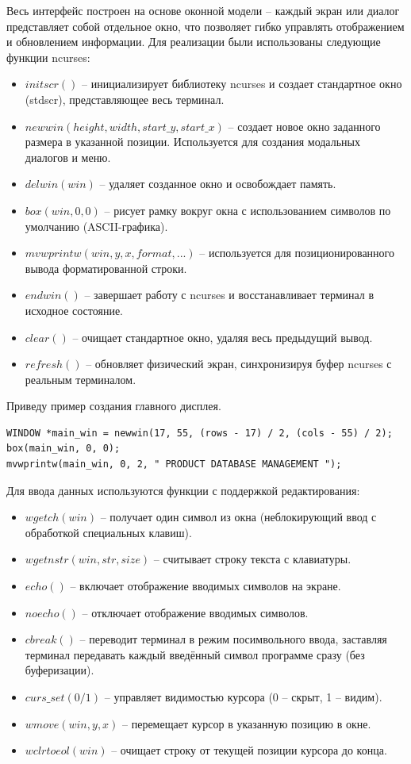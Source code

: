 \documentclass[14pt]{extreport}
\begin{document}
{Весь интерфейс построен на основе оконной модели -- каждый экран или диалог представляет собой отдельное окно, что позволяет гибко управлять отображением и обновлением информации.
Для реализации были использованы следующие функции ncurses: 
\begin{itemize}
    \item $initscr()$ -- инициализирует библиотеку ncurses и создает стандартное окно (stdscr), представляющее весь терминал. 
    \item $newwin(height, width, start\_y, start\_x)$ -- создает новое окно заданного размера в указанной позиции. Используется для создания модальных диалогов и меню.
    \item $delwin(win)$ -- удаляет созданное окно и освобождает память.
    \item $box(win, 0, 0)$ -- рисует рамку вокруг окна с использованием символов по умолчанию (ASCII-графика).
    \item $mvwprintw(win, y, x, format, ...)$ -- используется для позиционированного вывода форматированной строки. 
    \item $endwin()$ -- завершает работу с ncurses и восстанавливает терминал в исходное состояние. 
    \item $clear()$ -- очищает стандартное окно, удаляя весь предыдущий вывод.
    \item $refresh()$ -- обновляет физический экран, синхронизируя буфер ncurses с реальным терминалом.
\end{itemize}
Приведу пример создания главного дисплея.
\begin{verbatim}
WINDOW *main_win = newwin(17, 55, (rows - 17) / 2, (cols - 55) / 2);
box(main_win, 0, 0);
mvwprintw(main_win, 0, 2, " PRODUCT DATABASE MANAGEMENT ");
\end{verbatim}
Для ввода данных используются функции с поддержкой редактирования:
\begin{itemize}
    \item $wgetch(win)$ -- получает один символ из окна (неблокирующий ввод с обработкой специальных клавиш).
    \item $wgetnstr(win, str, size)$ -- считывает строку текста с клавиатуры.
    \item $echo()$ -- включает отображение вводимых символов на экране.
    \item $noecho()$ -- отключает отображение вводимых символов.
    \item $cbreak()$ -- переводит терминал в режим посимвольного ввода, заставляя терминал передавать каждый введённый символ программе сразу (без буферизации).
    \item $curs\_set(0/1)$ -- управляет видимостью курсора (0 -- скрыт, 1 -- видим).
    \item $wmove(win, y, x)$ -- перемещает курсор в указанную позицию в окне.
    \item $wclrtoeol(win)$ -- очищает строку от текущей позиции курсора до конца.
\end{itemize}


}
\end{document}
